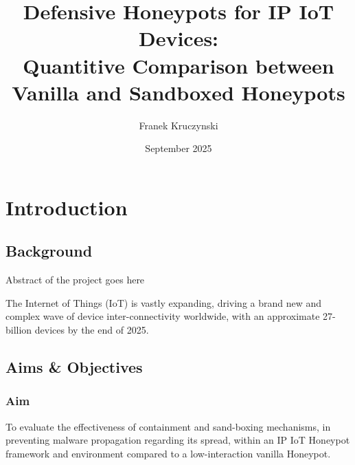 \documentclass[a4paper,12pt,oneside]{book}			%
\title{\huge\bfseries Defensive Honeypots for IP IoT Devices:\\Quantitive Comparison between Vanilla and Sandboxed Honeypots}
\author{\LARGE Franek Kruczynski}
\date{September 2025}
\begin{document}
\frontmatter			%
\maketitle				%
\setcounter{page}{1}		%
\pagestyle{fancy}

\tableofcontents 			%

\mainmatter 			%
\clearpage			




\chapter{Introduction}\label{ch:intro}		%
\section{Background}\label{sec:background}	%

Abstract of the project goes here

The Internet of Things (IoT) is vastly expanding, driving a brand new and complex wave of device inter-connectivity worldwide, with an approximate 27-billion devices by the end of 2025\textit{\citep{autobits2025iot}}.

\section{Aims \&{} Objectives}\label{sec:aimAndObjectives}

\subsection{Aim}\label{sec:aim}

To evaluate the effectiveness of containment and sand-boxing mechanisms, in preventing malware propagation regarding its spread, within an IP IoT Honeypot framework and environment compared to a low-interaction vanilla Honeypot.
\end{document}
